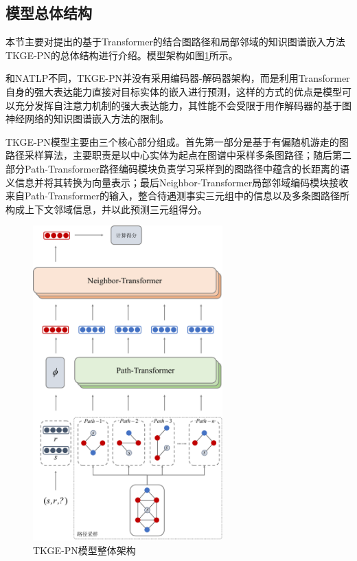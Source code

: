 \subsection{模型总体结构}

本节主要对提出的基于Transformer的结合图路径和局部邻域的知识图谱嵌入方法TKGE-PN的总体结构进行介绍。模型架构如图\ref{TKGE-PN_architecture}所示。

和NATLP不同，TKGE-PN并没有采用编码器-解码器架构，而是利用Transformer自身的强大表达能力直接对目标实体的嵌入进行预测，这样的方式的优点是模型可以充分发挥自注意力机制的强大表达能力，其性能不会受限于用作解码器的基于图神经网络的知识图谱嵌入方法的限制。

TKGE-PN模型主要由三个核心部分组成。首先第一部分是基于有偏随机游走的图路径采样算法，主要职责是以中心实体为起点在图谱中采样多条图路径；随后第二部分Path-Transformer路径编码模块负责学习采样到的图路径中蕴含的长距离的语义信息并将其转换为向量表示；最后Neighbor-Transformer局部邻域编码模块接收来自Path-Transformer的输入，整合待遇测事实三元组中的信息以及多条图路径所构成上下文邻域信息，并以此预测三元组得分。

\begin{figure}[htbp]
  \centerline{\includegraphics[width=0.65\textwidth]{pic/TKGE-PN_architecture.pdf}}
  \caption{TKGE-PN模型整体架构}
  \label{TKGE-PN_architecture}
\end{figure}

